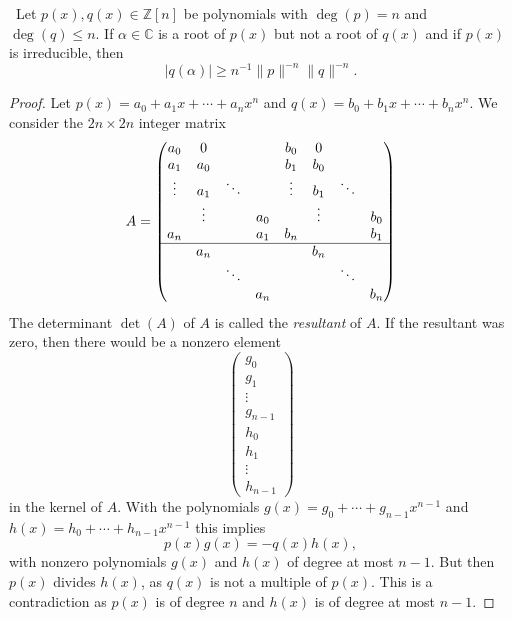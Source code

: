 \begin{lemma}\label{lem:10}\
  Let $p(x), q(x) ∈ℤ[n]$ be polynomials with $\deg(p) = n$ and $\deg(q) ≤ n$. If $α∈ℂ$ is a root of $p(x)$ but not a root of $q(x)$  and if $p(x)$ is irreducible, then
  \begin{displaymath}
    | q(α)| ≥ n^{-1} \|p\|^{-n} \|q\|^{-n}. 
  \end{displaymath}
\end{lemma}

\begin{proof}
  Let $p(x) = a_0 + a_1 x + \cdots + a_n x^n$ and $q(x) = b_0+b_1x+ \cdots+ b_nx^n$. We consider the $2n × 2n$ integer matrix
  \begin{displaymath}
    A = 
    \begin{pmatrix}
      a_0  &   0   &     &    &  b_0  &   0   &     &\\
      a_1  &   a_0 &     &    & b_1  &   b_0 &     &  \\
      \vdots &  a_1&  \ddots &  & \vdots &  b_1&  \ddots &   \\
              & \vdots&       & a_0 &  & \vdots&       & b_0 \\
              a_n    &       &       & a_1  &b_n    &       &       & b_1  \\
              \hline
               &   a_n  & &    &  &   b_n  & & \\
               &       & \ddots & &  &       & \ddots &\\
               &       &        & a_n & &       &        & b_n 
    \end{pmatrix}
  \end{displaymath}
  The determinant $\det(A)$ of $A$ is called the \emph{resultant} of $A$. If the resultant was zero, then there would be a nonzero element
  \begin{displaymath}
    \begin{pmatrix}
      g_0\\
      g_1\\
      \vdots\\
      g_{n-1} \\
       h_0\\
      h_1\\
      \vdots\\
      h_{n-1} 
    \end{pmatrix}
  \end{displaymath}
  in the kernel of $A$. With the polynomials $g(x) = g_0 + \cdots + g_{n-1}x^{n-1}$ and $h(x) = h_0 + \cdots + h_{n-1}x^{n-1}$ this implies
  \begin{displaymath}
    p(x) g(x) = - q(x) h(x),
  \end{displaymath}
  with nonzero polynomials $g(x)$ and $h(x)$ of degree at most $n-1$. But then $p(x)$ divides $h(x)$, as $q(x)$ is not a multiple of $p(x)$. This is a contradiction as $p(x)$ is of degree $n$ and $h(x)$ is of degree at most $n-1$.



\end{proof}
